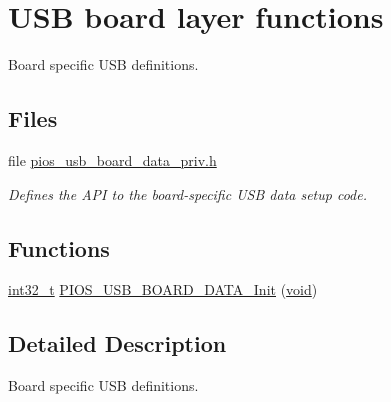 \hypertarget{group___p_i_o_s___u_s_b___b_o_a_r_d}{\section{U\-S\-B board layer functions}
\label{group___p_i_o_s___u_s_b___b_o_a_r_d}
}


Board specific U\-S\-B definitions.  


\subsection*{Files}
\begin{DoxyCompactItemize}
\item 
file \hyperlink{pios__usb__board__data__priv_8h}{pios\-\_\-usb\-\_\-board\-\_\-data\-\_\-priv.\-h}
\begin{DoxyCompactList}\small\item\em Defines the A\-P\-I to the board-\/specific U\-S\-B data setup code. \end{DoxyCompactList}\end{DoxyCompactItemize}
\subsection*{Functions}
\begin{DoxyCompactItemize}
\item 
\hyperlink{group___n_a_m_e_gafd12020da5a235dfcf0c3c748fb5baed}{int32\-\_\-t} \hyperlink{group___p_i_o_s___u_s_b___b_o_a_r_d_ga5efd94ab761f254827f38dba474cf642}{P\-I\-O\-S\-\_\-\-U\-S\-B\-\_\-\-B\-O\-A\-R\-D\-\_\-\-D\-A\-T\-A\-\_\-\-Init} (\hyperlink{group___n_a_m_e_ga18028b8badbf1ea7e704ccac3c488e82}{void})
\end{DoxyCompactItemize}


\subsection{Detailed Description}
Board specific U\-S\-B definitions. 

